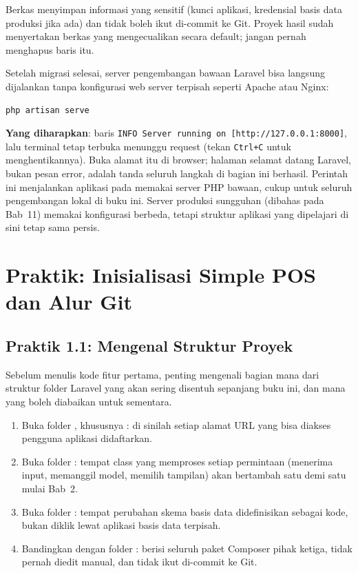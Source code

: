 \begin{warningbox}
Berkas  menyimpan informasi yang sensitif (kunci aplikasi,
kredensial basis data produksi jika ada) dan tidak boleh ikut di-commit ke
Git. Proyek hasil  sudah menyertakan berkas
 yang mengecualikan  secara default; jangan
pernah menghapus baris itu.
\end{warningbox}

Setelah migrasi selesai, server pengembangan bawaan Laravel bisa langsung
dijalankan tanpa konfigurasi web server terpisah seperti Apache atau Nginx:

\begin{lstlisting}[language=bash]
php artisan serve
\end{lstlisting}

\textbf{Yang diharapkan}: baris \texttt{INFO Server running on
[http://127.0.0.1:8000]}, lalu terminal tetap terbuka menunggu request
(tekan \texttt{Ctrl+C} untuk menghentikannya). Buka alamat itu di
browser; halaman selamat datang Laravel, bukan pesan error, adalah
tanda seluruh langkah di bagian ini berhasil. Perintah ini menjalankan
aplikasi pada  memakai server PHP bawaan,
cukup untuk seluruh pengembangan lokal di buku ini. Server produksi
sungguhan (dibahas pada Bab~11) memakai konfigurasi berbeda, tetapi
struktur aplikasi yang dipelajari di sini tetap sama persis.

\section{Praktik: Inisialisasi Simple POS dan Alur Git}
\label{sec:arsitektur-web-modern-3}

\subsection*{Praktik 1.1: Mengenal Struktur Proyek}

Sebelum menulis kode fitur pertama, penting mengenali bagian mana dari
struktur folder Laravel yang akan sering disentuh sepanjang buku ini, dan
mana yang boleh diabaikan untuk sementara.

\begin{enumerate}
  \item Buka folder , khususnya : di
    sinilah setiap alamat URL yang bisa diakses pengguna aplikasi
    didaftarkan.
  \item Buka folder : tempat class yang
    memproses setiap permintaan (menerima input, memanggil model, memilih
    tampilan) akan bertambah satu demi satu mulai Bab~2.
  \item Buka folder : tempat perubahan skema
    basis data didefinisikan sebagai kode, bukan diklik lewat aplikasi
    basis data terpisah.
  \item Bandingkan dengan folder : berisi seluruh paket
    Composer pihak ketiga, tidak pernah diedit manual, dan tidak ikut
    di-commit ke Git.
\end{enumerate}

